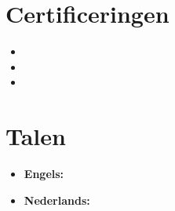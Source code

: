 \documentclass[11pt,a4paper]{article}
\begin{document}
\begin{itemize}[leftmargin=0pt,label={},itemsep=2em,topsep=0pt]
\vspace{0.5cm}
\section{Certificeringen}
\begin{itemize}[leftmargin=*,topsep=-6pt,parsep=0pt,partopsep=0pt,itemsep=0pt]
\item \CertHarvardXIntro
\item \CertMicrosoftNL
\item \CertDutch
\end{itemize}


\vspace{0.5cm}
\section{Talen}
\begin{itemize}[leftmargin=*]
\item \textbf{Engels:} \LangEnglishNL
\item \textbf{Nederlands:} \LangDutchNL
\end{itemize} 

\end{itemize}
\end{document}
